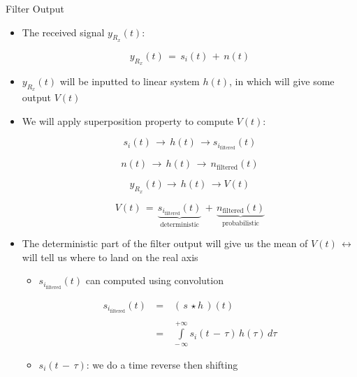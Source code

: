 \documentclass{Beamer}
\begin{document}
\begin{frame}[t,allowframebreaks]{Filter Output}

\begin{itemize}

\item The received signal $y_{R_x}(t)$:

\begin{equation}
y_{R_x}(t) \, = \, s_i(t) \, + \, n(t)
\end{equation}

\item $y_{R_x}(t)$ will be inputted to linear system $h(t)$, in which will give some output $V(t)$

\item We will apply superposition property to compute $V(t)$:

$$ s_i(t) \, \rightarrow \, h(t) \, \rightarrow s_{i_{\text{filtered}}}(t) $$

$$  n(t) \, \rightarrow \, h(t) \, \rightarrow \, n_{\text{filtered}}(t) $$

$$ y_{R_x}(t) \rightarrow \, h(t) \, \rightarrow V(t) $$

\begin{equation}
V(t) \, = \, \underbrace{s_{i_{\text{filtered}}}(t)}_{\text{deterministic}}  \, + \, \underbrace{n_{\text{filtered}}(t)}_{\text{probabilistic}}   
\end{equation}

\item The deterministic part of the filter output will give us the mean of $V(t) \, \leftrightarrow$ will tell us where to land on the real axis

	\begin{itemize}
	\item $s_{i_{\text{filtered}}}(t)$ can computed using convolution
	\end{itemize}

\begin{equation}
\begin{array}{rcl}
s_{i_{\text{filtered}}}(t) \, &=& \,  (\,s \, \star h \,)(t) \\ \\
&=& \, \displaystyle\int\limits_{- \, \infty}^{+ \infty} s_i(t \, - \, \tau) \, h(\tau) \, d\tau
\end{array}
\end{equation}

	\begin{itemize}
	\item $ s_i(t \, - \, \tau)$: we do a time reverse then shifting
	\end{itemize}


\end{itemize}
\end{frame}
\end{document}
